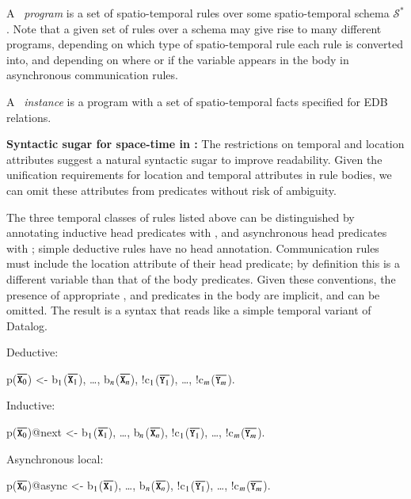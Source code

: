 A \lang\ {\em program} is a set of spatio-temporal rules over some spatio-temporal schema $\mathcal{S}^*$.  Note that a given set of rules over a schema may give rise to many different \lang programs, depending on which type of spatio-temporal rule each rule is converted into, and depending on where or if the variable  appears in the body in asynchronous communication rules.

A \lang\ {\em instance} is a program with a set of spatio-temporal facts specified for EDB relations.

\noindent
\textbf{Syntactic sugar for space-time in \lang:}
The restrictions on temporal and location attributes suggest a natural syntactic sugar to improve readability.  Given the unification requirements for location and temporal attributes in rule bodies, we can omit these attributes from predicates without risk of ambiguity.  

The three temporal classes of rules listed above can be distinguished by annotating inductive head predicates with , and asynchronous head predicates with ; simple deductive rules have no head annotation. 
Communication rules must include the location attribute of their head predicate; by definition this is a different variable than that of the body predicates.
 Given these conventions, the presence of appropriate ,  and  predicates in the body are implicit, and can be omitted.  The result is a syntax that reads like a simple temporal variant of Datalog.

Deductive:

\begin{Dedalus}
p(\(\overline{\dedalus{X}\sb{0}}\)) <- b\(\sb{1}\)(\(\overline{\dedalus{X}\sb{1}}\)), \ldots, b\(\sb{n}\)(\(\overline{\dedalus{X}\sb{n}}\)),
!c\(\sb{1}\)(\(\overline{\dedalus{Y}\sb{1}}\)), \ldots, !c\(\sb{m}\)(\(\overline{\dedalus{Y}\sb{m}}\)).
\end{Dedalus}

Inductive:

\begin{Dedalus}
p(\(\overline{\dedalus{X}\sb{0}}\))@next <- b\(\sb{1}\)(\(\overline{\dedalus{X}\sb{1}}\)), \ldots, b\(\sb{n}\)(\(\overline{\dedalus{X}\sb{n}}\)),
!c\(\sb{1}\)(\(\overline{\dedalus{Y}\sb{1}}\)), \ldots, !c\(\sb{m}\)(\(\overline{\dedalus{Y}\sb{m}}\)).
\end{Dedalus}

Asynchronous local:

\begin{Dedalus}
p(\(\overline{\dedalus{X}\sb{0}}\))@async <- b\(\sb{1}\)(\(\overline{\dedalus{X}\sb{1}}\)), \ldots, b\(\sb{n}\)(\(\overline{\dedalus{X}\sb{n}}\)),
!c\(\sb{1}\)(\(\overline{\dedalus{Y}\sb{1}}\)), \ldots, !c\(\sb{m}\)(\(\overline{\dedalus{Y}\sb{m}}\)).
\end{Dedalus}

